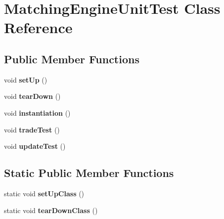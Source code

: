 \hypertarget{class_matching_engine_unit_test}{\section{Matching\+Engine\+Unit\+Test Class Reference}
\label{class_matching_engine_unit_test}
}
\subsection*{Public Member Functions}
\begin{DoxyCompactItemize}
\item 
\hypertarget{class_matching_engine_unit_test_a2fe9413d67e2ad0c8233d11d1f209548}{void {\bfseries set\+Up} ()}\label{class_matching_engine_unit_test_a2fe9413d67e2ad0c8233d11d1f209548}

\item 
\hypertarget{class_matching_engine_unit_test_adececd49e895e978d85a27b8470104d3}{void {\bfseries tear\+Down} ()}\label{class_matching_engine_unit_test_adececd49e895e978d85a27b8470104d3}

\item 
\hypertarget{class_matching_engine_unit_test_acbb8d543a15e349d8f46769388fd28bd}{void {\bfseries instantiation} ()}\label{class_matching_engine_unit_test_acbb8d543a15e349d8f46769388fd28bd}

\item 
\hypertarget{class_matching_engine_unit_test_a2dbbdf5632bac8d35d6902caf5556c5f}{void {\bfseries trade\+Test} ()}\label{class_matching_engine_unit_test_a2dbbdf5632bac8d35d6902caf5556c5f}

\item 
\hypertarget{class_matching_engine_unit_test_a914f15f54087d84798e02b33734a9791}{void {\bfseries update\+Test} ()}\label{class_matching_engine_unit_test_a914f15f54087d84798e02b33734a9791}

\end{DoxyCompactItemize}
\subsection*{Static Public Member Functions}
\begin{DoxyCompactItemize}
\item 
\hypertarget{class_matching_engine_unit_test_a35f673f5cdf8f8282686a1f84ee2dd37}{static void {\bfseries set\+Up\+Class} ()}\label{class_matching_engine_unit_test_a35f673f5cdf8f8282686a1f84ee2dd37}

\item 
\hypertarget{class_matching_engine_unit_test_a0fb23de300ffd3a7d2b42e84d457be09}{static void {\bfseries tear\+Down\+Class} ()}\label{class_matching_engine_unit_test_a0fb23de300ffd3a7d2b42e84d457be09}

\end{DoxyCompactItemize}


